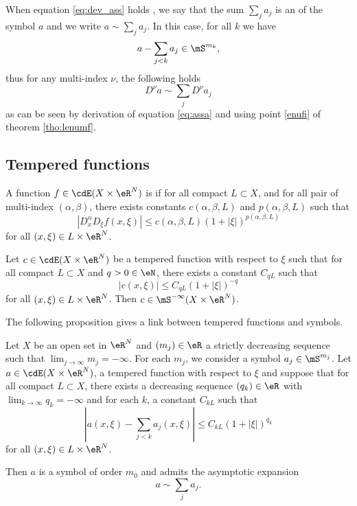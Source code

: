 When equation \eqref{eq:dev_ass} holds , we say that the sum $\sum_ja_j$ is an  of the symbol $a$ and we write $a\sim\sum_ja_j$. In this case, for all $k$ we have
\begin{equation} \label{eq:assa}
  a-\sum_{j<k}a_j\in\mS^{m_k},
\end{equation}
thus for any multi-index $\nu$, the following holds
\[ 
  D^{\nu}a\sim\sum_jD^{\nu}a_j
\]
as can be seen by derivation of equation \eqref{eq:assa} and using point \ref{enufi} of theorem \ref{tho:lenumf}.

\subsection{Tempered functions}

A function $f\in\cdE(X\times\eR^N)$ is  if for all compact $L\subset X$, and for all pair of multi-index $(\alpha,\beta)$, there exists constants $c(\alpha,\beta,L)$ and $p(\alpha,\beta,L)$ such that
 \[ 
|D_x^{\alpha}D_{\xi}f(x,\xi)|\leq c(\alpha,\beta,L)(1+|\xi|)^{p(\alpha,\beta,L)}
\]
for all $(x,\xi)\in L\times\eR^N$.


\begin{lemma} 
Let $c\in\cdE(X\times\eR^N)$ be a tempered function with respect to $\xi$ such that for all compact $L\subset X$ and $q>0\in\eN$, there exists a constant $C_{qL}$ such that
\[ 
|c(x,\xi)|\leq C_{qL}(1+|\xi|)^{-q}
\]
 for all $(x,\xi)\in L\times\eR^N$. Then $c\in\mS^{-\infty}(X\times\eR^N)$.
\label{lem:csymbol}
\end{lemma}

The following proposition gives a link between tempered functions and symbols.

\begin{proposition}
Let $X$ be an open set in $\eR^N$ and $(m_j)\in\eR$ a strictly decreasing sequence such that $\lim_{j\to\infty}m_j=-\infty$. For each $m_j$, we consider a symbol $a_j\in\mS^{m_j}$. Let $a\in\cdE(X\times\eR^N)$, a tempered function with respect to $\xi$ and suppose that for all compact $L\subset X$, there exists a decreasing sequence $(q_k)\in\eR$ with $\lim_{k\to\infty}q_k=-\infty$ and for each $k$, a constant $C_{kL}$ such that
\begin{equation}
   |a(x,\xi)-\sum_{j<k}a_j(x,\xi)|\leq C_{kL}(1+|\xi|)^{q_k}
\end{equation}
for all $(x,\xi)\in L\times\eR^N$.

Then $a$ is a symbol of order $m_0$ and admits the asymptotic expansion 
\[ 
a\sim\sum_ja_j.
\]

\end{proposition}

